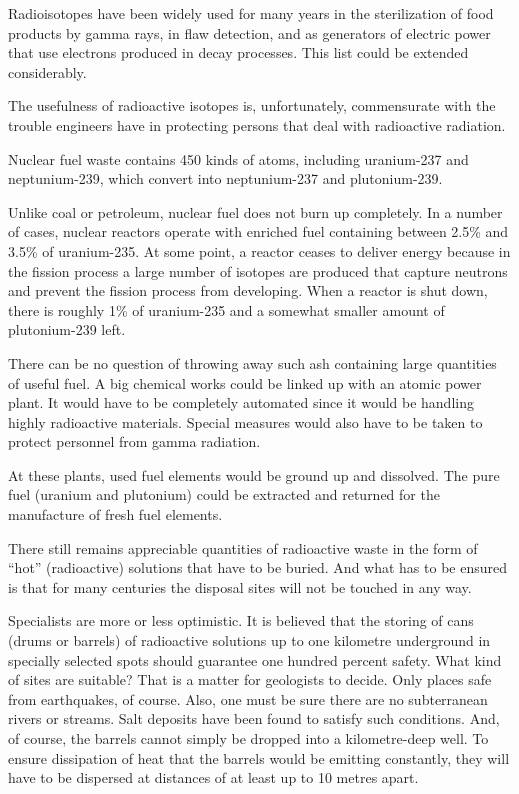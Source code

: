 Radioisotopes have been widely used for many years in the sterilization of food products by gamma rays, in flaw detection, and as generators of electric power that use electrons produced in decay processes. This list could be extended considerably.

The usefulness of radioactive isotopes is, unfortunately, commensurate with the trouble engineers have in pro­tecting persons that deal with radioactive radiation.

Nuclear fuel waste contains 450 kinds of atoms, includ­ing uranium-237 and neptunium-239, which convert into neptunium-237 and plutonium-239.

Unlike coal or petroleum, nuclear fuel does not burn up completely. In a number of cases, nuclear reactors op­erate with enriched fuel containing between 2.5\% and 3.5\% of uranium-235. At some point, a reactor ceases to deliver energy because in the fission process a large num­ber of isotopes are produced that capture neutrons and prevent the fission process from developing. When a reactor is shut down, there is roughly 1\% of uranium-235 and a somewhat smaller amount of plutonium-239 left.

There can be no question of throwing away such ash containing large quantities of useful fuel. A big chemical works could be linked up with an atomic power plant. It would have to be completely automated since it would be handling highly radioactive materials. Special mea­sures would also have to be taken to protect personnel from gamma radiation.

At these plants, used fuel elements would be ground up and dissolved. The pure fuel (uranium and plutonium) could be extracted and returned for the manufacture of fresh fuel elements.

There still remains appreciable quantities of radioactive waste in the form of ``hot'' (radioactive) solutions that have to be buried. And what has to be ensured is that for many centuries the disposal sites will not be touched in any way.

Specialists are more or less optimistic. It is believed that the storing of cans (drums or barrels) of radioactive solutions up to one kilometre underground in specially selected spots should guarantee one hundred percent safe­ty. What kind of sites are suitable? That is a matter for geologists to decide. Only places safe from earthquakes, of course. Also, one must be sure there are no subter­ranean rivers or streams. Salt deposits have been found to satisfy such conditions. And, of course, the barrels cannot simply be dropped into a kilometre-deep well. To ensure dissipation of heat that the barrels would be emitting constantly, they will have to be dispersed at distances of at least up to 10 metres apart.

